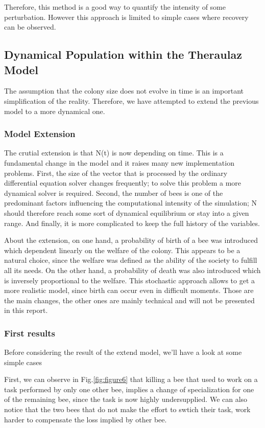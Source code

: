 Therefore, this method is a good way to quantify the intensity of
some perturbation. However this approach is limited to simple cases
where recovery can be observed.

\subsection{Dynamical Population within the Theraulaz Model}

The assumption that the colony size does not evolve in time is an
important simplification of the reality. Therefore, we have attempted
to extend the previous model to a more dynamical one.


\subsubsection{Model Extension}

The crutial extension is that N(t) is now depending on time. This
is a fundamental change in the model and it raises many new implementation
problems. First, the size of the vector that is processed by the ordinary
differential equation solver changes frequently; to solve this problem
a more dynamical solver is required. Second, the number of bees is
one of the predominant factors influencing the computational intensity
of the simulation; N should therefore reach some sort of dynamical
equilibrium or stay into a given range. And finally, it is more complicated
to keep the full history of the variables.

About the extension, on one hand, a probability of birth of a
bee was introduced which dependent linearly on the welfare of the
colony. This appears to be a natural choice, since the welfare was
defined as the ability of the society to fulfill all its needs. On
the other hand, a probability of death was also introduced which is
inversely proportional to the welfare. This stochastic
approach allows to get a more realistic model, since birth can occur
even in difficult moments. Those are the main changes, the other ones
are mainly technical and will not be presented in this report.

\subsubsection{First results}

Before considering the result of the extend model, we'll have a look
at some simple cases

First, we can observe in Fig.\ref{fig:figure6} that killing a bee that used
to work on a task performed by only one other bee, implies a change
of specialization for one of the remaining bee, since the task is
now highly undersupplied. We can also notice that the two bees that
do not make the effort to swtich their task, work harder to compensate
the loss implied by other bee.

